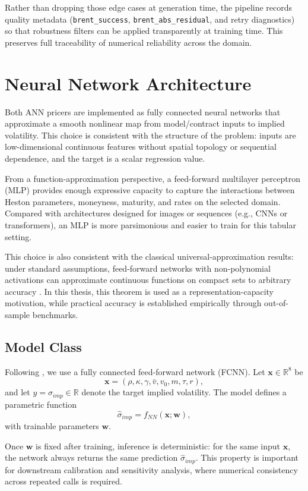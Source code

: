 Rather than dropping those edge cases at generation time, the pipeline records quality metadata (\texttt{brent\_success}, \texttt{brent\_abs\_residual}, and retry diagnostics) so that robustness filters can be applied transparently at training time. This preserves full traceability of numerical reliability across the domain.

\section{Neural Network Architecture}
Both ANN pricers are implemented as fully connected neural networks that approximate a smooth nonlinear map from model/contract inputs to implied volatility. This choice is consistent with the structure of the problem: inputs are low-dimensional continuous features without spatial topology or sequential dependence, and the target is a scalar regression value.

From a function-approximation perspective, a feed-forward multilayer perceptron (MLP) provides enough expressive capacity to capture the interactions between Heston parameters, moneyness, maturity, and rates on the selected domain. Compared with architectures designed for images or sequences (e.g., CNNs or transformers), an MLP is more parsimonious and easier to train for this tabular setting.

This choice is also consistent with the classical universal-approximation results: under standard assumptions, feed-forward networks with non-polynomial activations can approximate continuous functions on compact sets to arbitrary accuracy \cite{cybenko1989,hornik1991}. In this thesis, this theorem is used as a representation-capacity motivation, while practical accuracy is established empirically through out-of-sample benchmarks.

\subsection{Model Class}
Following \cite{liu}, we use a fully connected feed-forward network (FCNN). Let $\mathbf{x}\in\mathbb{R}^8$ be
\[
\mathbf{x}=(\rho,\kappa,\gamma,\bar v,v_0,m,\tau,r),
\]
and let $y=\sigma_{imp}\in\mathbb{R}$ denote the target implied volatility. The model defines a parametric function
\[
\hat \sigma_{imp} = f_{NN}(\mathbf{x};\mathbf{w}),
\]
with trainable parameters $\mathbf{w}$.

Once $\mathbf{w}$ is fixed after training, inference is deterministic: for the same input $\mathbf{x}$, the network always returns the same prediction $\hat \sigma_{imp}$. This property is important for downstream calibration and sensitivity analysis, where numerical consistency across repeated calls is required.

